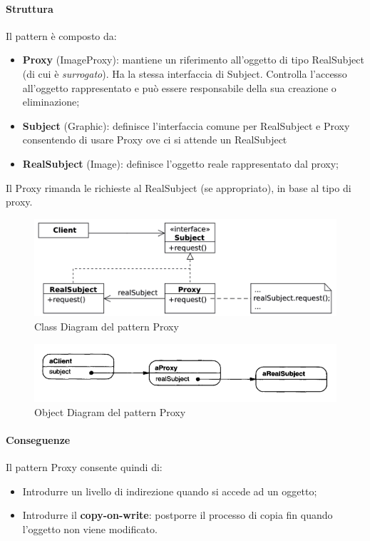\paragraph{Struttura} Il pattern è composto da:
\begin{itemize}
    \item \textbf{Proxy} (ImageProxy): mantiene un riferimento all'oggetto di tipo RealSubject (di cui è \textit{surrogato}). Ha la stessa interfaccia di Subject. Controlla l'accesso all'oggetto rappresentato e può essere responsabile della sua creazione o eliminazione;
    \item \textbf{Subject} (Graphic): definisce l'interfaccia comune per RealSubject e Proxy consentendo di usare Proxy ove ci si attende un RealSubject
    \item \textbf{RealSubject} (Image): definisce l'oggetto reale rappresentato dal proxy;
\end{itemize}

Il Proxy rimanda le richieste al RealSubject (se appropriato), in base al tipo di proxy.

\begin{figure}[H]
    \centering
    \includegraphics[width=0.75\linewidth]{assets/pattern/proxy/proxy-struttura.png}
    \caption{Class Diagram del pattern Proxy}
\end{figure}

\begin{figure}[H]
    \centering
    \includegraphics[width=0.75\linewidth]{assets/pattern/proxy/proxy-object-diagram.png}
    \caption{Object Diagram del pattern Proxy}
\end{figure}

\paragraph{Conseguenze} Il pattern Proxy consente quindi di:
\begin{itemize}
    \item Introdurre un livello di indirezione quando si accede ad un oggetto;
    \item Introdurre il \textbf{copy-on-write}: postporre il processo di copia fin quando l'oggetto non viene modificato.
\end{itemize}

